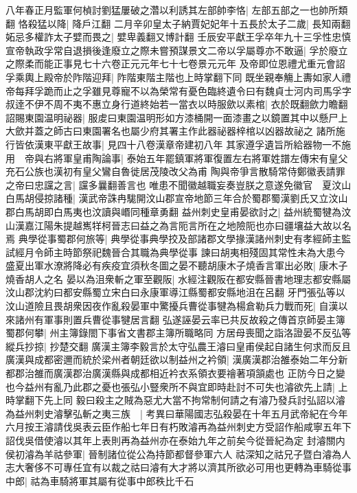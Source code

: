 八年春正月監軍何楨討劉猛屢破之濳以利誘其左部帥李恪|{
	左部五部之一也帥所類翻}
恪殺猛以降|{
	降戶江翻}
二月辛卯皇太子納賈妃妃年十五長於太子二歲|{
	長知兩翻}
妬忌多權詐太子嬖而畏之|{
	嬖卑義翻又博計翻}
壬辰安平獻王孚卒年九十三孚性忠慎宣帝執政孚常自退損後逢廢立之際未嘗預謀景文二帝以孚屬尊亦不敢逼|{
	孚於廢立之際柔而能正事見七十六卷正元元年七十七卷景元元年}
及帝即位恩禮尤重元會詔孚乘輿上殿帝於阼階迎拜|{
	阼階東階主階也上時掌翻下同}
既坐親奉觴上夀如家人禮帝每拜孚跪而止之孚雖見尊寵不以為榮常有憂色臨終遺令曰有魏貞士河内司馬孚字叔逹不伊不周不夷不惠立身行道終始若一當衣以時服歛以素棺|{
	衣於既翻歛力瞻翻}
詔賜東園温明祕器|{
	服䖍曰東園温明形如方漆桶開一面漆畫之以鏡置其中以懸尸上大歛并蓋之師古曰東園署名也屬少府其署主作此器祕器梓棺以凶器故祕之}
諸所施行皆依漢東平獻王故事|{
	見四十八卷漢章帝建初八年}
其家遵孚遺旨所給器物一不施用　帝與右將軍皇甫陶論事|{
	泰始五年罷鎮軍將軍復置左右將軍姓譜左傳宋有皇父充石公族也漢初有皇父鸞自魯徙居茂陵改父為甫}
陶與帝爭言散騎常侍鄭徽表請罪之帝曰忠讜之言|{
	讜多曩翻善言也}
唯患不聞徽越職妄奏豈朕之意遂免徽官　夏汶山白馬胡侵掠諸種|{
	漢武帝誅冉駹開汶山郡宣帝地節三年合於蜀郡蜀漢劉氏又立汶山郡白馬胡即白馬夷也汶讀與㟭同種章勇翻}
益州刺史皇甫晏欲討之|{
	益州統蜀犍為汶山漢嘉江陽朱提越嶲䍧柯晉志曰益之為言阨言所在之地險阨也亦曰疆壤益大故以名焉}
典學從事蜀郡何旅等|{
	典學從事典學挍及部諸郡文學掾漢諸州刺史有孝經師主監試經月令師主時節祭祀魏晉合其職為典學從事}
諫曰胡夷相殘固其常性未為大患今盛夏出軍水潦將降必有疾疫宜須秋冬圖之晏不聽胡康木子燒香言軍出必敗|{
	康木子燒香胡人之名}
晏以為沮衆斬之軍至觀阪|{
	水經注觀阪在都安縣晉書地理志都安縣屬汶山郡沈約曰都安縣蜀立宋白曰永康軍導江縣蜀都安縣地沮在呂翻}
牙門張弘等以汶山道險且畏胡衆因夜作亂殺晏軍中驚擾兵曹從事犍為楊倉勒兵力戰而死|{
	自漢以來諸州有軍事則置兵曹從事犍居言翻}
弘遂誣晏云率已共反故殺之傳首京師晏主簿蜀郡何攀|{
	州主簿錄閤下事省文書郡主簿所職略同}
方居母喪聞之詣洛證晏不反弘等縱兵抄掠|{
	抄楚交翻}
廣漢主簿李毅言於太守弘農王濬曰皇甫侯起自諸生何求而反且廣漢與成都密邇而統於梁州者朝廷欲以制益州之衿領|{
	漢廣漢郡治雒泰始二年分新都郡治雒而廣漢郡治廣漢縣與成都相近衿衣系領衣要禬著項頷處也}
正防今日之變也今益州有亂乃此郡之憂也張弘小豎衆所不與宜即時赴討不可失也濬欲先上請|{
	上時掌翻下先上同}
毅曰殺主之賊為惡尤大當不拘常制何請之有濬乃發兵討弘詔以濬為益州刺史濬擊弘斬之夷三族　|{
	考異曰華陽國志弘殺晏在十年五月武帝紀在今年六月按王濬請伐吳表云臣作船七年日有朽敗濬再為益州刺史方受詔作船咸寧五年下詔伐吳借使濬以其年上表則再為益州亦在泰始九年之前矣今從晉紀為定}
封濬關内侯初濬為羊祜參軍|{
	晉制諸位從公為持節都督參軍六人}
祜深知之祜兄子暨白濬為人志大奢侈不可專任宜有以裁之祜曰濬有大才將以濟其所欲必可用也更轉為車騎從事中郎|{
	祜為車騎將軍其屬有從事中郎秩比千石}

